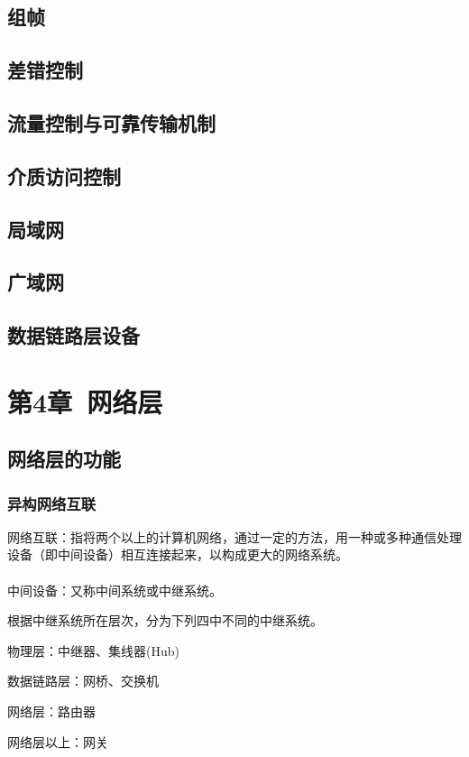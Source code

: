 \documentclass{ctexart}
\begin{document}
\subsection{组帧}
\subsection{差错控制}
\subsection{流量控制与可靠传输机制}
\subsection{介质访问控制}
\subsection{局域网}
\subsection{广域网}
\subsection{数据链路层设备}

\section{第4章\ 网络层}
\subsection{网络层的功能}
\subsubsection{异构网络互联}
网络互联：指将两个以上的计算机网络，通过一定的方法，用一种或多种通信处理设备（即中间设备）相互连接起来，以构成更大的网络系统。
\\\\
中间设备：又称中间系统或中继系统。

根据中继系统所在层次，分为下列四中不同的中继系统。

物理层：中继器、集线器(Hub)

数据链路层：网桥、交换机

网络层：路由器

网络层以上：网关
\\\\
\end{document}
